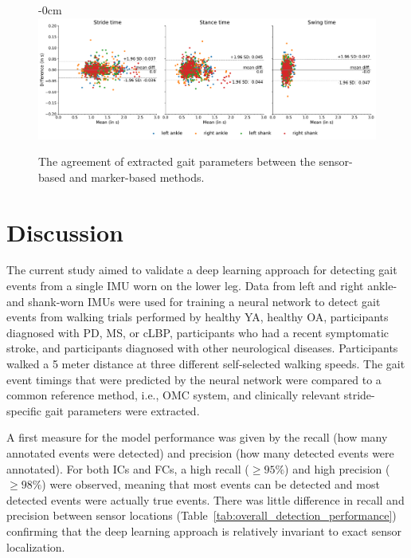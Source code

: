 \documentclass[sensors,article,submit,pdftex,moreauthors]{Definitions/mdpi}
\begin{document}
\begin{figure}[H]
	\begin{adjustwidth}{-\extralength}{0cm}
		\centering
		\includegraphics[width=18.5cm]{fig/bland_altman_plots_stride_params}
	\end{adjustwidth}
	\caption{The agreement of extracted gait parameters between the sensor-based and marker-based methods.\label{fig:gait_parameters_bland_altman_plots}}
\end{figure}  


\section{Discussion}
The current study aimed to validate a deep learning approach for detecting gait events from a single IMU worn on the lower leg. Data from left and right ankle- and shank-worn IMUs were used for training a neural network to detect gait events from walking trials performed by healthy YA, healthy OA, participants diagnosed with PD, MS, or cLBP, participants who had a recent symptomatic stroke, and participants diagnosed with other neurological diseases. Participants walked a 5 meter distance at three different self-selected walking speeds. The gait event timings that were predicted by the neural network were compared to a common reference method, i.e., OMC system, and clinically relevant stride-specific gait parameters were extracted. 

A first measure for the model performance was given by the recall (how many annotated events were detected) and precision (how many detected events were annotated). For both ICs and FCs, a high recall ($\ge 95\%$) and high precision ($\ge 98\%$) were observed, meaning that most events can be detected and most detected events were actually true events. There was little difference in recall and precision between sensor locations (Table~\ref{tab:overall_detection_performance}) confirming that the deep learning approach is relatively invariant to exact sensor localization. 
\end{document}
